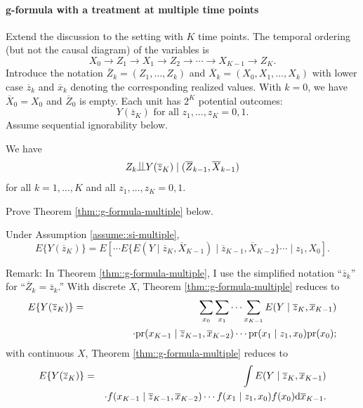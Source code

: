  
\paragraph{g-formula with a treatment at multiple time points}\label{problem::g-formula-multiple-time}



Extend the discussion to the setting with $K$ time points. The temporal ordering (but not the causal diagram) of the variables is
$$
X_0 \rightarrow Z_1 \rightarrow X_1 \rightarrow Z_2 \rightarrow \cdots  \rightarrow  X_{K-1}  \rightarrow Z_K .
$$
Introduce the notation $\overline{Z}_k = (Z_1, \ldots, Z_k)$ and $\overline{X}_k = (X_0, X_1, \ldots, X_k)$ with lower case $\overline{z}_k $ and $\overline{x}_k$  denoting the corresponding  realized values. With $k=0$, we have $\overline{X}_0 = X_0$ and $\overline{Z}_0$ is empty. 
Each unit has $2^K$ potential outcomes:
$$
Y(\overline{z}_K) \text{ for all } z_1,\ldots, z_K = 0,1.
$$
Assume sequential ignorability below.

\begin{assumption}
\label{assume::si-multiple}
We have
$$
Z_k \ind Y(\overline{z}_K) \mid (\overline{Z}_{k-1}, \overline{X}_{k-1})
$$
for all $k=1,\ldots, K$ and all $z_1,\ldots, z_K = 0,1.$
\end{assumption}


Prove Theorem \ref{thm::g-formula-multiple} below. 


\begin{theorem}
\label{thm::g-formula-multiple}
Under Assumption \ref{assume::si-multiple}, 
$$
E\{ Y(\overline{z}_K)  \} = E\left[ \cdots    
E\{   E(Y\mid \overline{z}_K, \overline{X}_{K-1}) \mid \overline{z}_{K-1}, \overline{X}_{K-2} \}
\cdots \mid z_1,  X_0 \right] .
$$
\end{theorem}


Remark: 
In Theorem \ref{thm::g-formula-multiple}, I use the simplified notation ``$\overline{z}_k$'' for  ``$\overline{Z}_k = \overline{z}_k $.''
With discrete $X$, Theorem \ref{thm::g-formula-multiple} reduces to
\begin{eqnarray*}
 E\{ Y(\overline{z}_K)  \}  
&=& 
\sum_{x_0} \sum_{x_1} \cdots   \sum_{x_{K-1}} 
 E(Y\mid \overline{z}_K, \overline{x}_{K-1})   \\
 && 
\qquad \qquad \cdot  \textup{pr}(x_{K-1}\mid \overline{z}_{K-1}, \overline{x}_{K-2}) 
 \cdots
 \textup{pr}(x_1\mid z_{1}, x_0)
 \textup{pr}(x_0) ; 
\end{eqnarray*} 
with continuous $X$, Theorem \ref{thm::g-formula-multiple} reduces to
\begin{eqnarray*}
  E\{ Y(\overline{z}_K)  \}  
&=& 
\int 
 E(Y\mid \overline{z}_K, \overline{x}_{K-1})   \\
 && \cdot 
 f(x_{K-1}\mid \overline{z}_{K-1}, \overline{x}_{K-2}) 
 \cdots
 f(x_1\mid z_{1}, x_0)
 f(x_0)
 \textnormal{d} \overline{x}_{K-1}   . 
\end{eqnarray*} 





